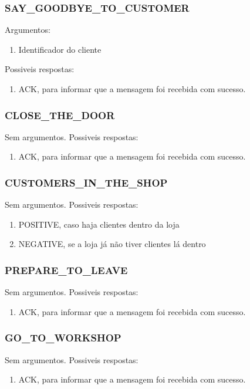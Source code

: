 \documentclass[11pt,a4paper]{report}
\begin{document}
\subsubsection{SAY\_GOODBYE\_TO\_CUSTOMER}
Argumentos:
\begin{enumerate}
    \itemsep-0.4em
    \item Identificador do cliente
\end{enumerate}
Possiveis respostas:
\begin{enumerate}
    \itemsep-0.4em
    \item ACK, para informar que a mensagem foi recebida com sucesso.
\end{enumerate}

\subsubsection{CLOSE\_THE\_DOOR}
Sem argumentos.
Possiveis respostas:
\begin{enumerate}
    \itemsep-0.4em
    \item ACK, para informar que a mensagem foi recebida com sucesso.
\end{enumerate}

\subsubsection{CUSTOMERS\_IN\_THE\_SHOP}
Sem argumentos.
Possiveis respostas:
\begin{enumerate}
    \itemsep-0.4em
    \item POSITIVE, caso haja clientes dentro da loja
    \item NEGATIVE, se a loja já não tiver clientes lá dentro
\end{enumerate}

\subsubsection{PREPARE\_TO\_LEAVE}
Sem argumentos.
Possiveis respostas:
\begin{enumerate}
    \itemsep-0.4em
    \item ACK, para informar que a mensagem foi recebida com sucesso.
\end{enumerate}


\subsubsection{GO\_TO\_WORKSHOP}
Sem argumentos.
Possiveis respostas:
\begin{enumerate}
    \itemsep-0.4em
    \item ACK, para informar que a mensagem foi recebida com sucesso.
\end{enumerate}
\end{document}
